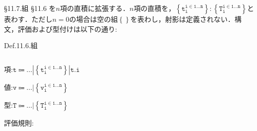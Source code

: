 \documentclass[9pt]{beamer}
\begin{document}
\begin{frame}{\S11.7.組}
\S11.6 を$n$項の直積に拡張する．$n$項の直積を，$\left\{\mathtt{t_{i}^{i\in 1\ldots n}}\right\}:\left\{\mathtt{T_{i}^{i\in 1\ldots n}}\right\}$と表わす．ただし$n = 0$の場合は空の組$\left\{\right\}$を表わし，射影は定義されない．構文，評価および型付けは以下の通り:\begin{alertblock}{Def.11.6.組}
\begin{columns}
\begin{column}{0.18\columnwidth}
項:$\mathtt{t\Coloneq\ldots|\left\{t_{i}^{i\in 1\ldots n}\right\}|t.i}$

値:$\mathtt{v\Coloneq\ldots|\left\{v_{i}^{i\in 1\ldots n}\right\}}$

型:$\mathtt{T\Coloneq\ldots|\left\{T_{i}^{i \in 1\ldots n}\right\}}$

評価規則:
\begin{prooftree}
\end{prooftree}
\end{column}
\begin{column}{0.7\columnwidth}
    \begin{prooftree}
        \end{prooftree}
\begin{prooftree}
\end{prooftree}
\begin{prooftree}
\end{prooftree}
\begin{prooftree}
\end{prooftree}
\end{column}
\end{columns}
\end{alertblock}
\end{frame}
\end{document}
